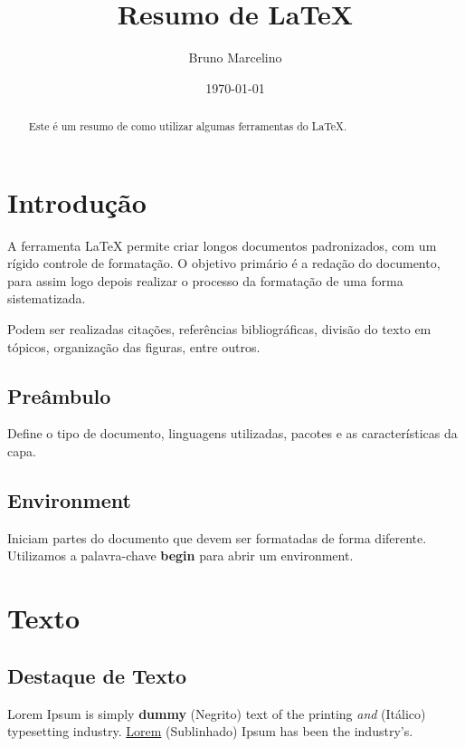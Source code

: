 \documentclass[12pt, a4paper]{article}
\title{Resumo de LaTeX}
\author{Bruno Marcelino}
\date{\today}
\begin{document}
\maketitle %


\begin{abstract}
    Este é um resumo de como utilizar algumas ferramentas do LaTeX.
\end{abstract}


\tableofcontents

\section*{Introdução}

    A ferramenta LaTeX permite criar longos documentos padronizados, com um rígido controle de formatação. O objetivo primário é a redação do documento, para assim logo depois realizar o processo da formatação de uma forma sistematizada.
    
    Podem ser realizadas citações, referências bibliográficas, divisão do texto em tópicos, organização das figuras, entre outros.

\subsection{Preâmbulo}

    Define o tipo de documento, linguagens utilizadas, pacotes e as características da capa.
    
\subsection{Environment}
    
    Iniciam partes do documento que devem ser formatadas de forma diferente. Utilizamos a palavra-chave \textbf{begin} para abrir um environment.

\section{Texto}

\subsection{Destaque de Texto}
Lorem Ipsum is simply \textbf{dummy} (Negrito)
text of the printing \textit{and} (Itálico)
typesetting industry. \underline{Lorem} (Sublinhado)
Ipsum has been the industry's.
\end{document}
